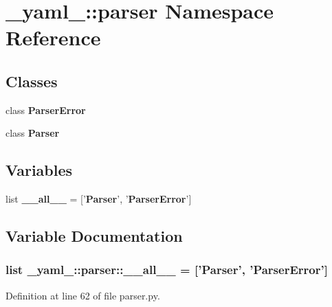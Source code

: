 \section{\_\-yaml\_\-::parser Namespace Reference}
\label{namespace__yaml___1_1parser}


\subsection*{Classes}
\begin{CompactItemize}
\item 
class {\bf ParserError}
\item 
class {\bf Parser}
\end{CompactItemize}
\subsection*{Variables}
\begin{CompactItemize}
\item 
list {\bf \_\-\_\-all\_\-\_\-} = ['{\bf Parser}', '{\bf ParserError}']
\end{CompactItemize}


\subsection{Variable Documentation}
\subsubsection{\setlength{\rightskip}{0pt plus 5cm}list {\bf \_\-yaml\_\-::parser::\_\-\_\-all\_\-\_\-} = ['{\bf Parser}', '{\bf ParserError}']\hspace{0.3cm}{\tt  [static]}}\label{namespace__yaml___1_1parser_7eabe481970d1fc3d5ebc45fc7a19c99}




Definition at line 62 of file parser.py.